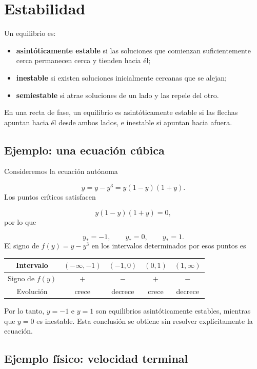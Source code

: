 \documentclass[12pt,a4paper]{article}
\begin{document}
	\clearpage
	\section{Estabilidad}

	Un equilibrio es:

	\begin{itemize}[leftmargin=*]
		\item \textbf{asintóticamente estable} si las soluciones que comienzan suficientemente cerca permanecen cerca y tienden hacia él;
		\item \textbf{inestable} si existen soluciones inicialmente cercanas que se alejan;
		\item \textbf{semiestable} si atrae soluciones de un lado y las repele del otro.
	\end{itemize}

	En una recta de fase, un equilibrio es asintóticamente estable si las flechas apuntan hacia él desde ambos lados, e inestable si apuntan hacia afuera.

	\subsection{Ejemplo: una ecuación cúbica}

	Consideremos la ecuación autónoma

	\[
	\dot{y}=y-y^3=y(1-y)(1+y).
	\]
Los puntos críticos satisfacen

	\[
	y(1-y)(1+y)=0,
	\]
por lo que

	\[
	y_\ast=-1,\qquad y_\ast=0,\qquad y_\ast=1.
	\]
El signo de \(f(y)=y-y^3\) en los intervalos determinados por esos puntos es

	\begin{center}
		\begin{tabular}{ccccc}
			\toprule
			Intervalo & \((-\infty,-1)\) & \((-1,0)\) & \((0,1)\) & \((1,\infty)\) \\
			\midrule
			Signo de \(f(y)\) & \(+\) & \(-\) & \(+\) & \(-\) \\
			Evolución & crece & decrece & crece & decrece \\
			\bottomrule
		\end{tabular}
	\end{center}

	Por lo tanto, \(y=-1\) e \(y=1\) son equilibrios asintóticamente estables, mientras que \(y=0\) es inestable. Esta conclusión se obtiene sin resolver explícitamente la ecuación.

	\subsection{Ejemplo físico: velocidad terminal}
\end{document}
